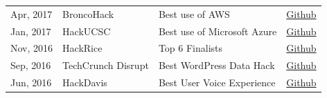 \documentclass[]{deedy-resume-openfont}
\begin{document}
\begin{minipage}[t]{0.66\textwidth}
\begin{tabular}{ l l l l }
Apr, 2017 &
BroncoHack &
Best use of AWS &
\href{https://github.com/desaiuditd/slycam}{Github} \\

Jan, 2017 &
HackUCSC &
Best use of Microsoft Azure &
\href{https://github.com/desaiuditd/outtatheblues}{Github} \\

Nov, 2016 &
HackRice &
Top 6 Finalists  &
\href{https://github.com/desaiuditd/wayfarer}{Github} \\

Sep, 2016 &
TechCrunch Disrupt &
Best WordPress Data Hack &
\href{https://github.com/desaiuditd/incognitech}{Github} \\

Jun, 2016 &
HackDavis &
Best User Voice Experience &
\href{https://github.com/desaiuditd/roomscore}{Github} \\

\end{tabular}

\end{minipage}
\end{document}
